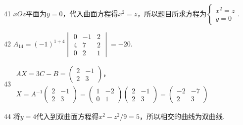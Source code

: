 41
$xOz\mathrm{平面为}y=0，\mathrm{代入曲面方程得}x^2=z，\mathrm{所以题目所求方程为}\left\{\begin{array}{l}x^2=z\\y=0\end{array}\right..$


42
$A_{14}=\left(-1\right)^{1+4}\begin{vmatrix}0&-1&2\\4&7&2\\0&2&1\end{vmatrix}=-20.$


43
$\begin{array}{l}AX=3C-B=\begin{pmatrix}2&-1\\2&3\end{pmatrix}，\\X=A^{-1}\begin{pmatrix}2&-1\\2&3\end{pmatrix}=\begin{pmatrix}1&-2\\0&1\end{pmatrix}\begin{pmatrix}2&-1\\2&3\end{pmatrix}=\begin{pmatrix}-2&-7\\2&3\end{pmatrix}\end{array}$


44
$将y=4\mathrm{代入到双曲面方程得}x^2-z^2/9=5，\mathrm{所以相交的曲线为双曲线}.$


